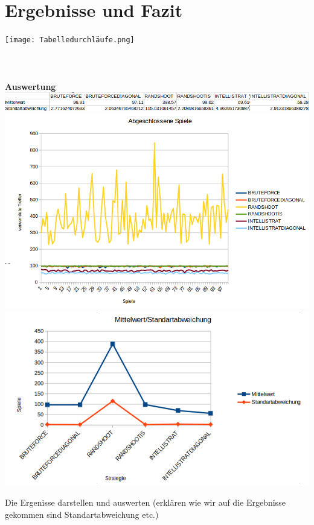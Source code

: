 \section*{Ergebnisse und Fazit}

\texttt{[image: Tabelledurchläufe.png]}\\
\\
\\
\\
\textbf{Auswertung}\\
\includegraphics[scale=0.5]{Auswertung.png}\\
\includegraphics[scale=0.3]{Abgeschlossene Spiele.png}
\includegraphics[scale=0.3]{Screenshot from 2022-02-11 13-19-17.png}


Die Ergenisse darstellen und auswerten (erklären wie wir auf die Ergebnisse gekommen sind Standartabweichung etc.)

